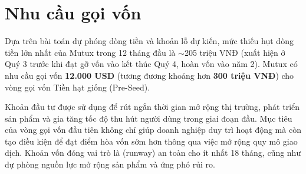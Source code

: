 \section{Nhu cầu gọi vốn}
Dựa trên bài toán dự phóng dòng tiền và khoản lỗ dự kiến, mức thiếu hụt dòng tiền lớn nhất của Mutux trong 12 tháng đầu là $\sim$205 triệu VNĐ (xuất hiện ở Quý 3 trước khi đạt gỡ vốn vào kết thúc Quý 4, hoàn vốn vào năm 2). Mutux có nhu cầu gọi vốn \textbf{12.000 USD} (tương đương khoảng hơn \textbf{300 triệu VNĐ}) cho vòng gọi vốn Tiền hạt giống (Pre-Seed).

Khoản đầu tư được sử dụng để rút ngắn thời gian mở rộng thị trường, phát triển sản phẩm và gia tăng tốc độ thu hút người dùng trong giai đoạn đầu. Mục tiêu của vòng gọi vốn đầu tiên không chỉ giúp doanh nghiệp duy trì hoạt động mà còn tạo điều kiện để đạt điểm hòa vốn sớm hơn thông qua việc mở rộng quy mô giao dịch. Khoản vốn đóng vai trò là (runway) an toàn cho ít nhất 18 tháng, cũng như dự phòng nguồn lực mở rộng sản phẩm và ứng phó rủi ro.
